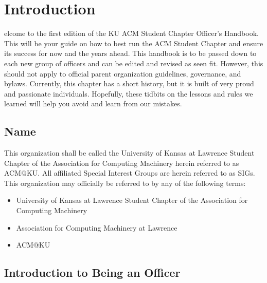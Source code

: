 %
%
\let\textcircled=\pgftextcircled
\chapter{Introduction}
\label{chap:intro}

elcome to the first edition of the KU ACM Student Chapter Officer's Handbook. This will be your guide on how to best run the ACM Student Chapter and ensure its success for now and the years ahead. This handbook is to be passed down to each new group of officers and can be edited and revised as seen fit. However, this should not apply to official parent organization guidelines, governance, and bylaws. Currently, this chapter has a short history, but it is built of very proud and passionate individuals. Hopefully, these tidbits on the lessons and rules we learned will help you avoid and learn from our mistakes.

\section{Name}
\label{sec:sec01}

This organization shall be called the University of Kansas at Lawrence Student Chapter of the Association for Computing Machinery herein referred to as ACM@KU. All affiliated Special Interest Groups are herein referred to as SIGs.
This organization may officially be referred to by any of the following terms:
\begin{itemize}
	\item University of Kansas at Lawrence Student Chapter of the Association for Computing Machinery
	\item Association for Computing Machinery at Lawrence
	\item ACM@KU
\end{itemize}

\section{Introduction to Being an Officer}
\label{sec:sec02}

